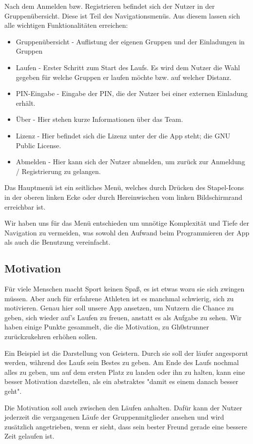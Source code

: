 Nach dem Anmelden bzw. Registrieren befindet sich der Nutzer in der Gruppenübersicht. Diese ist Teil des Navigationsmenüs. Aus diesem lassen sich alle wichtigen Funktionalitäten erreichen:
\begin{itemize}
\item Gruppenübersicht - Auflistung der eigenen Gruppen und der Einladungen in Gruppen
\item Laufen - Erster Schritt zum Start des Laufs. Es wird dem Nutzer die Wahl gegeben für welche Gruppen er laufen möchte bzw. auf welcher Distanz.
\item PIN-Eingabe - Eingabe der PIN, die der Nutzer bei einer externen Einladung erhält.
\item Über - Hier stehen kurze Informationen über das Team.
\item Lizenz - Hier befindet sich die Lizenz unter der die App steht; die GNU Public License. 
\item Abmelden - Hier kann sich der Nutzer abmelden, um zurück zur Anmeldung / Registrierung zu gelangen.
\end{itemize}

Das Hauptmenü ist ein seitliches Menü, welches durch Drücken des Stapel-Icons in der oberen linken Ecke oder durch Hereinwischen vom linken Bildschirmrand erreichbar ist.

Wir haben uns für das Menü entschieden um unnötige Komplexität und Tiefe der Navigation zu vermeiden, was sowohl den Aufwand beim Programmieren der App als auch die Benutzung vereinfacht.
\subsection{Motivation}
Für viele Menschen macht Sport keinen Spaß, es ist etwas wozu sie sich zwingen müssen. Aber auch für erfahrene Athleten ist es manchmal schwierig, sich zu motivieren. Genau hier soll unsere App ansetzen, um Nutzern die Chance zu geben, sich wieder auf's Laufen zu freuen, anstatt es als Aufgabe zu sehen. Wir haben einige Punkte gesammelt, die die Motivation, zu Gh0strunner zurückzukehren erhöhen sollen.

Ein Beispiel ist die Darstellung von Geistern. Durch sie soll der läufer angespornt werden, während des Laufs sein Bestes zu geben. Am Ende des Laufs nochmal alles zu geben, um auf dem ersten Platz zu landen oder ihn zu halten, kann eine besser Motivation darstellen, als ein abstraktes "damit es einem danach besser geht".

Die Motivation soll auch zwischen den Läufen anhalten. Dafür kann der Nutzer jederzeit die vergangenen Läufe der Gruppenmitglieder ansehen und wird zusätzlich angetrieben, wenn er sieht, dass sein bester Freund gerade eine bessere Zeit gelaufen ist.

